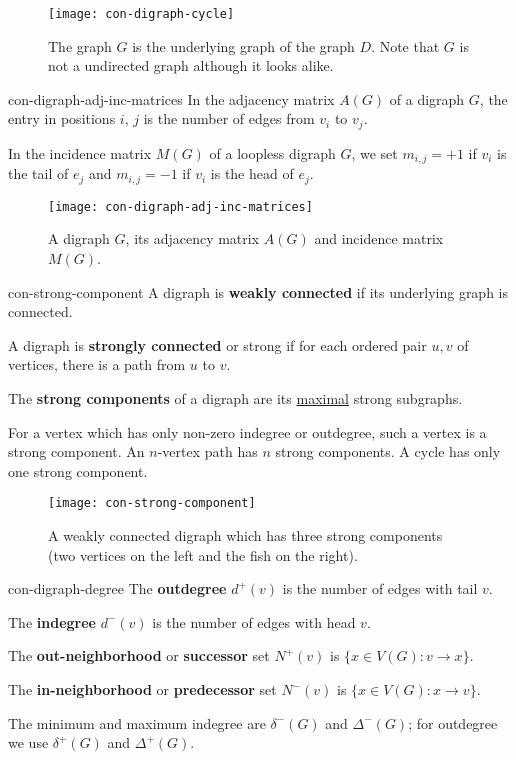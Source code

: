 \documentclass[../src/handouts/main.tex]{subfiles}
\begin{document}
\begin{figure}[htbp]
  \centering
  \texttt{[image: con-digraph-cycle]}
  \caption{The graph $G$ is the underlying graph of the graph $D$. Note that $G$ is not a undirected graph although it looks alike.}
  \label{fig:con-digrpah-underlying-graph}
\end{figure}

\begin{definition}{}{con-digraph-adj-inc-matrices}
  In the adjacency matrix $A(G)$ of a digraph $G$, the entry in positions $i,\, j$ is the number of edges from $v_i$ to $v_j$.

  In the incidence matrix $M(G)$ of a loopless digraph $G$, we set $m_{i, j} = +1$ if $v_i$ is the tail of $e_j$ and $m_{i, j} = -1$ if $v_i$ is the head of $e_j$.
\end{definition}

\begin{figure}[htbp]
  \centering
  \texttt{[image: con-digraph-adj-inc-matrices]}
  \caption{A digraph $G$, its adjacency matrix $A(G)$ and incidence matrix $M(G)$.}
  \label{fig:con-digraph-adj-inc-matrices}
\end{figure}

\begin{definition}{}{con-strong-component}
  A digraph is \textbf{weakly connected} if its underlying graph is connected.

  A digraph is \textbf{strongly connected} or strong if for each ordered pair $u, v$ of vertices, there is a path from $u$ to $v$.

  The \textbf{strong components} of a digraph are its \ul{maximal} strong subgraphs.
\end{definition}

For a vertex which has only non-zero indegree or outdegree, such a vertex is a strong component. An $n$-vertex path has $n$ strong components. A cycle has only one strong component.

\begin{figure}[htbp]
  \centering
  \texttt{[image: con-strong-component]}
  \caption{A weakly connected digraph which has three strong components (two vertices on the left and the fish on the right).}
  \label{fig:con-strong-component}
\end{figure}

\begin{definition}{}{con-digraph-degree}
  The \textbf{outdegree} $d^{+}(v)$ is the number of edges with tail $v$.

  The \textbf{indegree} $d^{-}(v)$ is the number of edges with head $v$.

  The \textbf{out-neighborhood} or \textbf{successor} set $N^{+}(v)$ is $\{x \in V(G): v \rightarrow x\}$.

  The \textbf{in-neighborhood} or \textbf{predecessor} set $N^{-}(v)$ is $\{x \in V(G): x \rightarrow v\}$.

  The minimum and maximum indegree are $\delta^{-}(G)$ and $\Delta^{-}(G)$; for outdegree we use $\delta^{+}(G)$ and $\Delta^{+}(G)$.
\end{definition}
\end{document}
